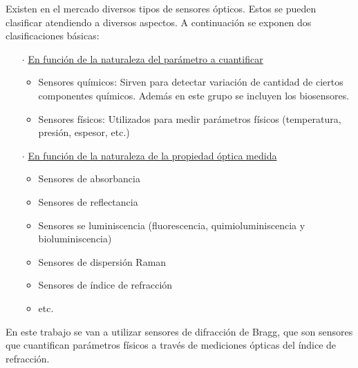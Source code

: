 		
		Existen en el mercado diversos tipos de sensores ópticos. Estos se pueden clasificar atendiendo a diversos aspectos. A continuación se exponen dos clasificaciones básicas\cite{sensoresOpticos}: 

			\begin{itemize}
				\item[$\cdot$] \underline{En función de la naturaleza del parámetro a cuantificar}
				\begin{itemize}
					\item Sensores químicos: Sirven para detectar variación de cantidad de ciertos componentes químicos. Además en este grupo se incluyen los biosensores.
					\item Sensores físicos: Utilizados para medir parámetros físicos (temperatura, presión, espesor, etc.)
				\end{itemize}
				\item[$\cdot$] \underline{En función de la naturaleza de la propiedad óptica medida}
				\begin{itemize}
					\item Sensores de absorbancia
					\item Sensores de reflectancia
					\item Sensores se luminiscencia (fluorescencia, quimioluminiscencia y bioluminiscencia)
					\item Sensores de dispersión Raman
					\item Sensores de índice de refracción
					\item etc.
				\end{itemize}
				\end{itemize}
			
			
				En este trabajo se van a utilizar sensores de difracción de Bragg, que son sensores que cuantifican parámetros físicos a través de mediciones ópticas del índice de refracción.
		
